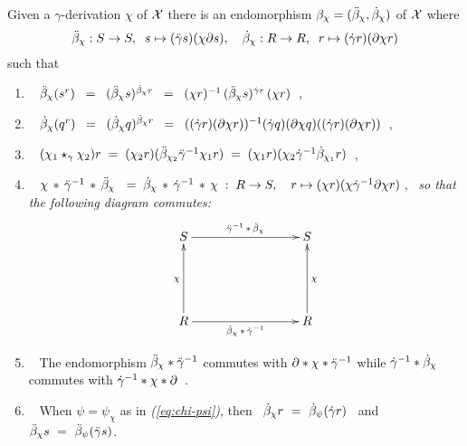 \begin{lem} \label{lem:gamma-beta-chi}
Given a $\gamma$-derivation $\chi$ of $\mathcal{X}$ there is an endomorphism 
$\beta_{\chi} = (\ddot{\beta}_{\chi}, \dot{\beta}_{\chi})$
of $\mathcal{X}$ where
$$
\ddot{\beta}_{\chi} : S \to S, \;\; s \mapsto (\ddot{\gamma} s)(\chi \partial s), \quad
 \dot{\beta}_{\chi} : R \to R, \;\; r \mapsto  (\dot{\gamma} r)(\partial \chi r)
$$
such that 
\begin{enumerate}[{\rm (a)}]
\item~
$\ddot{\beta}_{\chi}(s^r) 
  \;\;=\;\;  (\ddot{\beta}_{\chi}s)^{\dot{\beta}_{\chi}r}
  \;\;=\;\;  (\chi r)^{-1}\,(\ddot{\beta}_{\chi} s)^{\dot{\gamma} r}\,(\chi r)$~,
\item~
$\dot{\beta}_{\chi}(q^r)
  \;\;=\;\;  (\dot{\beta}_{\chi}q)^{\dot{\beta}_{\chi}r}
  \;\;=\;\;  ((\dot{\gamma} r)(\partial\chi r))^{-1}(\dot{\gamma} q)(\partial\chi q)
                     ((\dot{\gamma} r)(\partial\chi r))$~, 
\item~ 
$(\chi_1\star_{\gamma}\chi_2) r 
\;=\;
(\chi_2 r)(\ddot{\beta}_{\chi_2} \ddot{\gamma}^{-1} \chi_1 r)
\;=\;
(\chi_1 r)(\chi_2 \dot{\gamma}^{-1} \dot{\beta}_{\chi_1} r)$~,
\item~
$\chi\,*\,{\ddg}^{-1}\,*\,\ddb_{\chi}\ 
 \;=\; \db_{\chi}\,*\,{\dg}^{-1}\,*\,\chi
 \;:\; R \to S, \quad r \mapsto (\chi r)(\chi\dg^{-1}\partial\chi r)$\,,~
\emph{so that the following diagram commutes:}
\begin{equation} \label{eq:gamma-sqchi}
\vcenter{\xymatrix{
   S \ar[rrr]^{{\ddg}^{-1}\,*\,\ddb_{\chi}}
     &&& S \\
     &&&  \\
   R \ar[uu]^{\chi} \ar[rrr]_{\db_{\chi}\,*\,{\dg}^{-1}} 
     &&& R \ar[uu]_{\chi}
}}
\end{equation}
\item~
The endomorphism  $\ddot{\beta}_{\chi} * \ddot{\gamma}^{-1}$  
commutes with  $\partial * \chi * \ddot{\gamma}^{-1}$  
while  $\dot{\gamma}^{-1} * \dot{\beta}_\chi$ commutes with  $\dot{\gamma}^{-1} * \chi * \partial$~. 
\item~
When $\psi = \psi_{\chi}$ as in \emph{(\ref{eq:chi-psi})}, 
then ~$\dot{\beta}_{\chi}r ~=~ \dot{\beta}_{\psi}(\dot{\gamma} r)$~ 
and ~$\ddot{\beta}_{\chi}s ~=~ \ddot{\beta}_{\psi}(\ddot{\gamma} s)$. 
\end{enumerate}
\end{lem}

